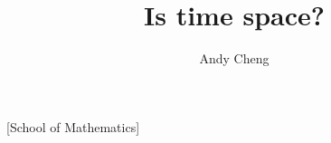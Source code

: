 

\usepackage{ifthen}
\usepackage{tikz}
\usetikzlibrary{calc}
\usetikzlibrary{decorations.pathreplacing}

\usepackage{bm}
\usepackage{array}

\graphicspath{{../../figs/}{../figures/}{../../dimension/}{../../schur/figs/}}

\newcommand{\edit}[1]{{\color{blue} #1}}
\newcommand{\nssp}{u}
\newcommand{\sspRedM}{\sspRed^{(-)}}
\renewcommand{\ssp}{u}
\renewcommand{\zeit}{t}
\renewcommand{\jEigvec}[1][]{\ensuremath{{\bf e}_{#1}}} %
\renewcommand{\jEigvecT}[1][]{\ensuremath{{\bf e}_{#1}^\top}} %
\newcommand{\jEigvecRed}[1][]{\ensuremath{\hat{{\bf e}}_{#1}}}

\renewcommand{\RPO}[1]{\ensuremath{\overline{rpo}_{#1}}} %
\renewcommand{\trDiscr}[2]{C_{#1}^{#2}}
\renewcommand{\Lg}{\ensuremath{\mathbf{T}}}
\renewcommand{\exampl}[2]{
  \vskip -13mm
    \begin{exmple}
      \noindent\small
      \textsf{\textbf{#1}} ~
      \slshape\sffamily{#2}
    \end{exmple}
  \vskip -1mm
}

\DeclareMathOperator{\im}{Im}
\DeclareMathOperator{\re}{Re}
\DeclareMathOperator{\diag}{Diag}
\DeclareMathOperator{\dist}{dist}
\DeclareMathOperator{\const}{const}

\title{Is time space?}
\author{Andy Cheng}

[School of Mathematics]

